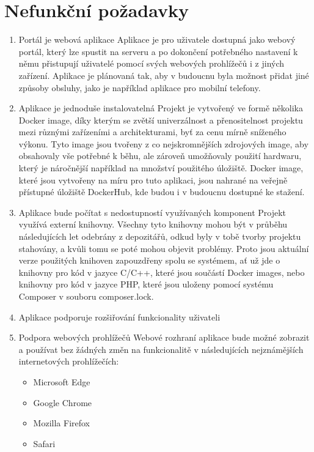 \section{Nefunkční požadavky}
{ %
\renewcommand{\labelenumi}{N\arabic{enumi}}

\begin{enumerate}
\item{Portál je webová aplikace}
Aplikace je pro uživatele dostupná jako webový portál, který lze spustit na serveru a po dokončení potřebného nastavení k němu přistupují uživatelé pomocí svých webových prohlížečů i z jiných zařízení. Aplikace je plánovaná tak, aby v budoucnu byla možnost přidat jiné způsoby obsluhy, jako je například aplikace pro mobilní telefony.
\item{Aplikace je jednoduše instalovatelná}
Projekt je vytvořený ve formě několika Docker image, díky kterým se zvětší univerzálnost a přenositelnost projektu mezi různými zařízeními a architekturami, byť za cenu mírně sníženého výkonu. Tyto image jsou tvořeny z co nejskromnějších zdrojových image, aby obsahovaly vše potřebné k běhu, ale zároveň umožňovaly použití hardwaru, který je náročnější například na množství použitého úložiště. Docker image, které jsou vytvořeny na míru pro tuto aplikaci, jsou nahrané na veřejně přístupné úložiště DockerHub, kde budou i v budoucnu dostupné ke stažení.
\item{Aplikace bude počítat s nedostupností využívaných komponent}
Projekt využívá externí knihovny. Všechny tyto knihovny mohou být v průběhu následujících let odebrány z depozitářů, odkud byly v tobě tvorby projektu stahovány, a kvůli tomu se poté mohou objevit problémy. Proto jsou aktuální verze použitých knihoven zapouzdřeny spolu se systémem, ať už jde o knihovny pro kód v jazyce C/C++, které jsou součástí Docker images, nebo knihovny pro kód v jazyce PHP, které jsou uloženy pomocí systému Composer v souboru composer.lock.
\item{Aplikace podporuje rozšiřování funkcionality uživateli}
\item{Podpora webových prohlížečů}
Webové rozhraní aplikace bude možné zobrazit a používat bez žádných změn na funkcionalitě v následujících nejznámějších internetových prohlížečích:
\begin{itemize}
\item{Microsoft Edge}
\item{Google Chrome}
\item{Mozilla Firefox}
\item{Safari}
\end{itemize}
\end{enumerate}
} %

